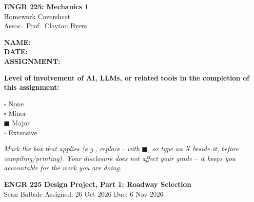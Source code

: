 \documentclass[11pt]{article}
\begin{document}
\begin{titlepage}
    \centering
    \vspace*{2cm}
    {\LARGE \bfseries ENGR 225: Mechanics 1} \\[0.3cm]
    {\Large Homework Coversheet} \\[0.3cm]
    {\large Assoc.\ Prof.\ Clayton Byers} \\[2cm]

    \begin{flushleft}
        \Large
        \textbf{NAME:} \underline{} \\[1cm]
        \textbf{DATE:} \underline{} \\[1cm]
        \textbf{ASSIGNMENT:} \underline{} \\[2cm]
    \end{flushleft}

    \large
    \textbf{Level of involvement of AI, LLMs, or related tools in the completion of this assignment:}

    \vspace{1cm}

    \begin{flushleft}
        \Large
        $\square$ \quad None \\[0.7cm]
        $\square$ \quad Minor \\[0.7cm]
        $\blacksquare$ \quad Major \\[0.7cm]
        $\square$ \quad Extensive \\[1.5cm]
    \end{flushleft}

    \normalsize
    \textit{Mark the box that applies (e.g., replace $\square$ with $\blacksquare$, or type an X beside it, before compiling/printing). Your disclosure does not affect your grade -- it keeps you accountable for the work you are doing.}
\end{titlepage}

\begin{center}
    {\Large \bfseries ENGR 225 Design Project, Part 1: Roadway Selection} \\[0.2cm]
    Sean Balbale \hfill Assigned: 26 Oct 2026 \hfill Due: 6 Nov 2026
\end{center}
\end{document}
